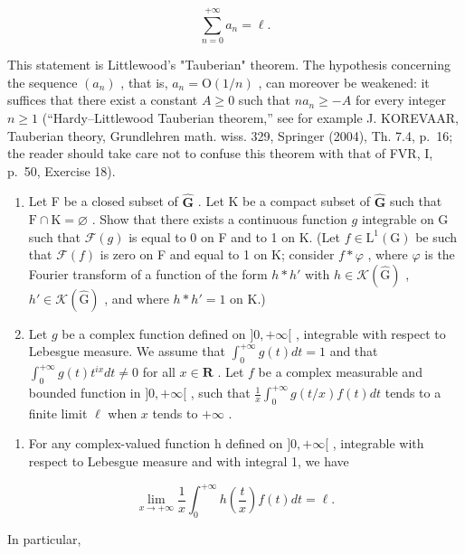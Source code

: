 \[
\sum_ {n = 0} ^ {+ \infty} a _ {n} = \ell .
\]

This statement is Littlewood's "Tauberian" theorem. The hypothesis concerning the sequence \((a_n)\) , that is, \(a_n = \mathrm{O}(1/n)\) , can moreover be weakened: it suffices that there exist a constant \(A \geqslant 0\) such that \(na_n \geqslant -A\) for every integer \(n \geqslant 1\) (“Hardy–Littlewood Tauberian theorem,” see for example J. KOREVAAR, Tauberian theory, Grundlehren math. wiss. 329, Springer (2004), Th. 7.4, p.~16; the reader should take care not to confuse this theorem with that of FVR, I, p.~50, Exercise 18).

\begin{enumerate}
\def\labelenumi{\arabic{enumi})}
\setcounter{enumi}{1}
\item
  Let F be a closed subset of \(\widehat{\mathbf{G}}\) . Let K be a compact subset of \(\widehat{\mathbf{G}}\) such that \(\mathrm{F} \cap \mathrm{K} = \varnothing\) . Show that there exists a continuous function \(g\) integrable on G such that \(\mathcal{F}(g)\) is equal to 0 on F and to 1 on K. (Let \(f \in \mathrm{L}^{1}(\mathrm{G})\) be such that \(\mathcal{F}(f)\) is zero on F and equal to 1 on K; consider \(f * \varphi\) , where \(\varphi\) is the Fourier transform of a function of the form \(h * h'\) with \(h \in \mathcal{K}(\widehat{\mathrm{G}})\) , \(h' \in \mathcal{K}(\widehat{\mathrm{G}})\) , and where \(h * h' = 1\) on K.)
\item
  Let \(g\) be a complex function defined on \(]0, +\infty[\) , integrable with respect to Lebesgue measure. We assume that \(\int_0^{+\infty} g(t)dt = 1\) and that \(\int_0^{+\infty} g(t)t^{ix}dt \neq 0\) for all \(x \in \mathbf{R}\) . Let \(f\) be a complex measurable and bounded function in \(]0, +\infty[\) , such that \(\frac{1}{x}\int_0^{+\infty} g(t/x)f(t)dt\) tends to a finite limit \(\ell\) when \(x\) tends to \(+\infty\) .
\end{enumerate}

\begin{enumerate}
\def\labelenumi{\alph{enumi})}
\tightlist
\item
  For any complex-valued function h defined on \(]0, +\infty[\) , integrable with respect to Lebesgue measure and with integral 1, we have
\end{enumerate}

\[
\lim _ {x \to + \infty} \frac {1}{x} \int_ {0} ^ {+ \infty} h \left(\frac {t}{x}\right) f (t) d t = \ell .
\]

In particular,

